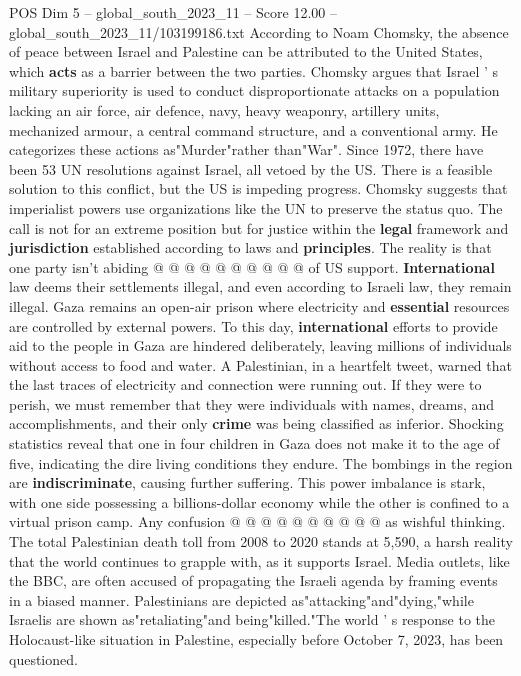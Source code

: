 \begin{textsample}{POS Dim 5 – global\_south\_2023\_11 – Score 12.00 – global\_south\_2023\_11/103199186.txt}
According to Noam Chomsky, the absence of peace between Israel and Palestine can be attributed to the United States, which \textbf{acts} as a barrier between the two parties.
Chomsky argues that Israel ' s military superiority is used to conduct disproportionate attacks on a population lacking an air force, air defence, navy, heavy weaponry, artillery units, mechanized armour, a central command structure, and a conventional army.
He categorizes these actions as"Murder"rather than"War".
Since 1972, there have been 53 UN resolutions against Israel, all vetoed by the US.
There is a feasible solution to this conflict, but the US is impeding progress.
Chomsky suggests that imperialist powers use organizations like the UN to preserve the status quo.
The call is not for an extreme position but for justice within the \textbf{legal} framework and \textbf{jurisdiction} established according to laws and \textbf{principles}.
The reality is that one party isn't abiding @ @ @ @ @ @ @ @ @ @ of US support. \textbf{International} law deems their settlements illegal, and even according to Israeli law, they remain illegal.
Gaza remains an open-air prison where electricity and \textbf{essential} resources are controlled by external powers.
To this day, \textbf{international} efforts to provide aid to the people in Gaza are hindered deliberately, leaving millions of individuals without access to food and water.
A Palestinian, in a heartfelt tweet, warned that the last traces of electricity and connection were running out.
If they were to perish, we must remember that they were individuals with names, dreams, and accomplishments, and their only \textbf{crime} was being classified as inferior.
Shocking statistics reveal that one in four children in Gaza does not make it to the age of five, indicating the dire living conditions they endure.
The bombings in the region are \textbf{indiscriminate}, causing further suffering.
This power imbalance is stark, with one side possessing a billions-dollar economy while the other is confined to a virtual prison camp.
Any confusion @ @ @ @ @ @ @ @ @ @ as wishful thinking.
The total Palestinian death toll from 2008 to 2020 stands at 5,590, a harsh reality that the world continues to grapple with, as it supports Israel.
Media outlets, like the BBC, are often accused of propagating the Israeli agenda by framing events in a biased manner.
Palestinians are depicted as"attacking"and"dying,"while Israelis are shown as"retaliating"and being"killed."The world ' s response to the Holocaust-like situation in Palestine, especially before October 7, 2023, has been questioned.

\end{textsample}
